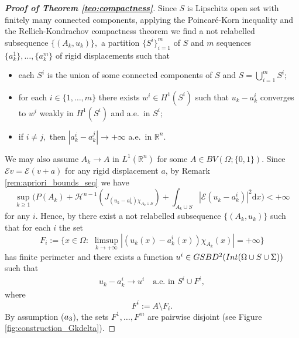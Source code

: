 \documentclass[reqno]{amsart}
\numberwithin{equation}{section}
\theoremstyle{plain}
\theoremstyle{definition}
\newcommand{\R}{\mathbb{R}}
\newcommand{\cH}{\mathcal{H}}
\renewcommand{\d}{\mathrm{d}}
\newcommand{\str}[1]{\mathcal{E}#1}
\newcommand{\substrate}{S}
\newcommand{\Ins}[1]{{\rm Int}{(#1\cup \substrate\cup \Sigma)}}
\begin{document}
\begin{proof}[\textbf{Proof of Theorem \ref{teo:compactness}}]
Since $S$ is Lipschitz open set with finitely many connected components, applying the Poincar\'e-Korn inequality and the Rellich-Kondrachov compactness theorem we find a not relabelled subsequence $\{(A_k,u_k)\},$ a partition $\{S^i\}_{i=1}^m$ of $\substrate$ and $m$ sequences $\{a_k^1\},\ldots,\{a_k^m\}$ of rigid displacements such that 
\begin{itemize}
 \item[($\rm a_1$)] each $S^i$ is the union of some connected components of $\substrate$ and $S=\bigcup_{i=1}^m S^i;$
 
 \item[($\rm a_2$)] for each $i\in\{1,\ldots,m\}$ there exists $w^i\in H^1(S^i)$ such that $u_k - a_k^i$ converges to $w^i$ weakly in $H^1(S^i)$ and a.e.\ in $S^i;$
 
 \item[($\rm a_3$)] if $i\ne j,$  then $|a_k^i - a_k^j|\to+\infty$ a.e.\  in $\R^n.$
\end{itemize}
We may also assume $A_k\to A$ in $L^1(\R^n)$ for some $A\in BV(\Omega;\{0,1\}).$ 
Since $\str{v} =\str{(v + a)}$ for any rigid displacement $a$, by Remark \ref{rem:apriori_bounds_seq} we have
$$
\sup_{k\ge1} \Big(P(A_k) + \cH^{n-1}(J_{(u_k - a_k^i)\chi_{A_k\cup S}}) + \int_{A_k \cup S} |\str{(u_k-a_k^i)}|^2\d x\Big)<+\infty 
$$
for any $i.$ Hence, by \cite[Theorem 1.1]{ChC:2020_jems} there exist a not relabelled subsequence $\{(A_k,u_k)\}$ such that for each $i$ the set 
$$
F_i:=\{x\in \Omega:\,\,\limsup\limits_{k\to+\infty}|(u_k(x) - a_k^i(x))\chi_{A_k}(x)|=+\infty \}
$$
has finite perimeter and there exists a function $u^i\in GSBD^2(\Ins{\Omega})$ such that 
\begin{align*}
u_k-a_k^i \to u^i \quad\text{a.e.\  in $S^i\cup F^i,$} 
\end{align*}
where 
$$
F^i:=A\setminus F_i.
$$
By assumption ($\rm a_3$), the sets $F^1,\ldots,F^m$ are pairwise disjoint
(see Figure \ref{fig:construction_Gkdelta}). 



\end{proof}
\end{document}
